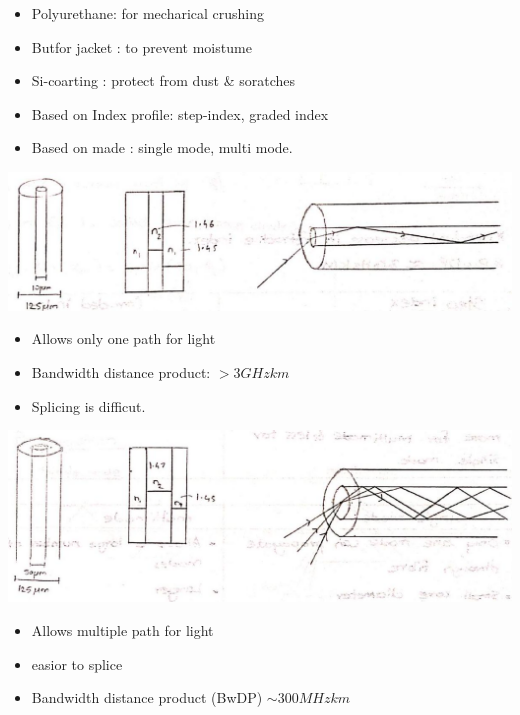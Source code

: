 \documentclass[12pt, a4paper]{article}
\begin{document}
\begin{itemize}
	\item Polyurethane: for mecharical crushing
	\item Butfor jacket : to prevent moistume
	\item Si-coarting : protect from dust \& soratches
\end{itemize}


\begin{itemize}
	\item Based on Index profile: step-index, graded index
	\item Based on made : single mode, multi mode.
\end{itemize}


\begin{center}
	\includegraphics[max width=\textwidth]{2024_06_16_30d750483617f1939202g-05(1)}
\end{center}

\begin{itemize}
	\item Allows only one path for light
	\item Bandwidth distance product: $>3 \unit{GHzkm}$
	\item Splicing is difficut.
\end{itemize}

\includegraphics[max width=\textwidth, center]{2024_06_16_30d750483617f1939202g-05(4)}

\begin{itemize}
	\item Allows multiple path for light
	\item easior to splice
	\item Bandwidth distance product (BwDP) $\sim 300 \unit{MHz km}$
\end{itemize}
\end{document}
